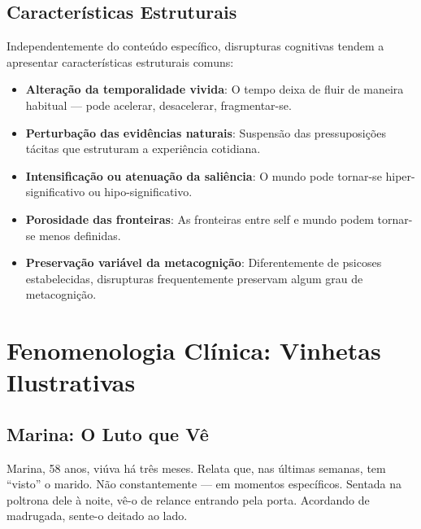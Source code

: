 \subsection{Características Estruturais}

Independentemente do conteúdo específico, disrupturas cognitivas tendem a apresentar características estruturais comuns:

\begin{itemize}
\item \textbf{Alteração da temporalidade vivida}: O tempo deixa de fluir de maneira habitual --- pode acelerar, desacelerar, fragmentar-se.

\item \textbf{Perturbação das evidências naturais}: Suspensão das pressuposições tácitas que estruturam a experiência cotidiana.

\item \textbf{Intensificação ou atenuação da saliência}: O mundo pode tornar-se hiper-significativo ou hipo-significativo.

\item \textbf{Porosidade das fronteiras}: As fronteiras entre self e mundo podem tornar-se menos definidas.

\item \textbf{Preservação variável da metacognição}: Diferentemente de psicoses estabelecidas, disrupturas frequentemente preservam algum grau de metacognição.
\end{itemize}

\section{Fenomenologia Clínica: Vinhetas Ilustrativas}
\label{sec:vinhetas}

\subsection{Marina: O Luto que Vê}

Marina, 58 anos, viúva há três meses. Relata que, nas últimas semanas, tem \enquote{visto} o marido. Não constantemente --- em momentos específicos. Sentada na poltrona dele à noite, vê-o de relance entrando pela porta. Acordando de madrugada, sente-o deitado ao lado.

